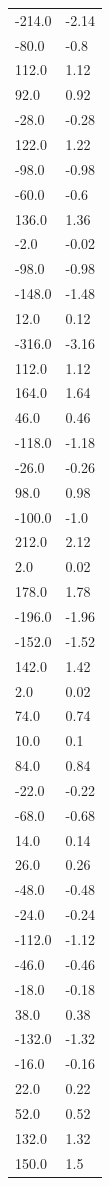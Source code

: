 \begin{longtable}{ll}
-214.0 & -2.14 \\
-80.0 & -0.8 \\
112.0 & 1.12 \\
92.0 & 0.92 \\
-28.0 & -0.28 \\
122.0 & 1.22 \\
-98.0 & -0.98 \\
-60.0 & -0.6 \\
136.0 & 1.36 \\
-2.0 & -0.02 \\
-98.0 & -0.98 \\
-148.0 & -1.48 \\
12.0 & 0.12 \\
-316.0 & -3.16 \\
112.0 & 1.12 \\
164.0 & 1.64 \\
46.0 & 0.46 \\
-118.0 & -1.18 \\
-26.0 & -0.26 \\
98.0 & 0.98 \\
-100.0 & -1.0 \\
212.0 & 2.12 \\
2.0 & 0.02 \\
178.0 & 1.78 \\
-196.0 & -1.96 \\
-152.0 & -1.52 \\
142.0 & 1.42 \\
2.0 & 0.02 \\
74.0 & 0.74 \\
10.0 & 0.1 \\
84.0 & 0.84 \\
-22.0 & -0.22 \\
-68.0 & -0.68 \\
14.0 & 0.14 \\
26.0 & 0.26 \\
-48.0 & -0.48 \\
-24.0 & -0.24 \\
-112.0 & -1.12 \\
-46.0 & -0.46 \\
-18.0 & -0.18 \\
38.0 & 0.38 \\
-132.0 & -1.32 \\
-16.0 & -0.16 \\
22.0 & 0.22 \\
52.0 & 0.52 \\
132.0 & 1.32 \\
150.0 & 1.5 \\

\end{longtable}
